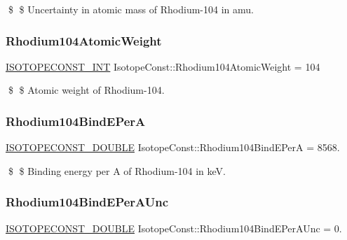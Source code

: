 \$ \$ Uncertainty in atomic mass of Rhodium-\/104 in amu. \mbox{\label{group___isotope_const-_rhodium-_rh104_ga14d33e759633bcd1e7463336b07d875e}} 
\subsubsection{\texorpdfstring{Rhodium104\+Atomic\+Weight}{Rhodium104AtomicWeight}}
{\footnotesize\ttfamily \mbox{\hyperlink{group___isotope_const-_macros_ga5f18360b3e99483a35c32d789e62621c}{I\+S\+O\+T\+O\+P\+E\+C\+O\+N\+S\+T\+\_\+\+I\+NT}} Isotope\+Const\+::\+Rhodium104\+Atomic\+Weight = 104}

\$ \$ Atomic weight of Rhodium-\/104. \mbox{\label{group___isotope_const-_rhodium-_rh104_ga364f0ce1702a53ef77670e3eae6eb5ef}} 
\subsubsection{\texorpdfstring{Rhodium104\+Bind\+E\+PerA}{Rhodium104BindEPerA}}
{\footnotesize\ttfamily \mbox{\hyperlink{group___isotope_const-_macros_ga8f45a7272ce02c0b4c65c44636ed719a}{I\+S\+O\+T\+O\+P\+E\+C\+O\+N\+S\+T\+\_\+\+D\+O\+U\+B\+LE}} Isotope\+Const\+::\+Rhodium104\+Bind\+E\+PerA = 8568.}

\$ \$ Binding energy per A of Rhodium-\/104 in keV. \mbox{\label{group___isotope_const-_rhodium-_rh104_gadad097b6a537fd3e0ef7b90778282a7c}} 
\subsubsection{\texorpdfstring{Rhodium104\+Bind\+E\+Per\+A\+Unc}{Rhodium104BindEPerAUnc}}
{\footnotesize\ttfamily \mbox{\hyperlink{group___isotope_const-_macros_ga8f45a7272ce02c0b4c65c44636ed719a}{I\+S\+O\+T\+O\+P\+E\+C\+O\+N\+S\+T\+\_\+\+D\+O\+U\+B\+LE}} Isotope\+Const\+::\+Rhodium104\+Bind\+E\+Per\+A\+Unc = 0.}


